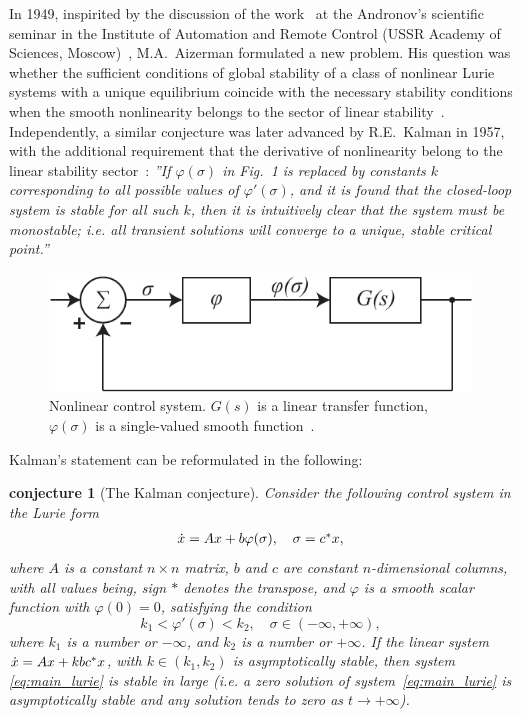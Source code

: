 \documentclass{ifacconf}
\theoremstyle{plain}
\newtheorem{conjecture}{conjecture}
\begin{document}
In 1949, inspirited by the discussion of the work~\citep{AndronovM-1944}
at the Andronov's scientific seminar in the Institute of Automation and Remote Control
(USSR Academy of Sciences, Moscow)~\citep{Bissell-1998},
M.A.~Aizerman formulated a new problem.
His question was whether
the sufficient conditions of global stability of
a class of nonlinear Lurie systems with a unique equilibrium
coincide with the necessary stability conditions
when the smooth nonlinearity belongs to the sector of linear stability~\citep{Aizerman-1949}.
Independently, a similar conjecture was later advanced by R.E.~Kalman in 1957,
with the additional requirement that the derivative of nonlinearity
belong to the linear stability sector~\citep{Kalman-1957}:
\emph{''If $\varphi(\sigma)$ in Fig.~1
is replaced by constants
$k$ corresponding to all possible values of $\varphi'(\sigma)$, and
it is found that the closed-loop system is stable for
all such $k$, then it is intuitively clear that the system
must be monostable; i.e. all transient solutions
will converge to a unique, stable critical point.''}
\begin{figure}[ht]
  \centering
  \includegraphics[width=\linewidth]{FIG/KalmanScheme.pdf}
  \caption{Nonlinear control system. $G(s)$ is a linear transfer
  function, $\varphi(\sigma)$ is a single-valued smooth function~\citep{Kalman-1957}.}
  \label{fig:kalman_scheme}
\end{figure}

Kalman's statement can be reformulated in the
following:
\begin{conjecture}[The Kalman conjecture]
  Consider the following control system in the Lurie form
  \begin{equation}\label{eq:main_lurie}
    \begin{array}{l}
    \dot{{\rm x}} = A {\rm x} + b \varphi(\sigma),\quad \sigma = c^{*}{\rm x},
    \end{array}
  \end{equation}
  where $A$ is a constant $n \times n$ matrix, $b$ and $c$ are constant
  $n$-dimensional columns, with all values being, sign $*$
  denotes the transpose, and $\varphi$ is a smooth scalar function with $\varphi(0) = 0$,
  satisfying the condition
  \begin{equation}\label{cond:kalman}
    k_1 < \varphi'(\sigma) < k_2, \quad \sigma \in (-\infty,+\infty),
  \end{equation}
  where $k_1$ is a number or $-\infty$, and $k_2$ is a number or $+\infty$.
  If the linear system $\dot{{\rm x}} = A {\rm x} + k b c^* {\rm x}$, with $k \in (k_1, k_2)$
  is asymptotically stable, then system \eqref{eq:main_lurie}
  is stable in large (i.e. a zero solution of system~\eqref{eq:main_lurie} is asymptotically stable
  and any solution tends to zero as $t \to +\infty$).
\end{conjecture}
\end{document}
